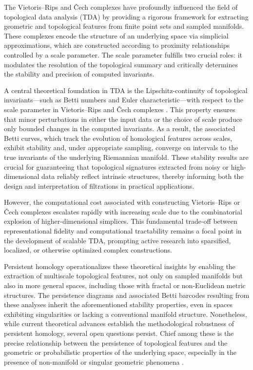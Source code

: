 \documentclass[sigconf]{acmart}
\begin{document}
The Vietoris–Rips and Čech complexes have profoundly influenced the field of topological data analysis (TDA) by providing a rigorous framework for extracting geometric and topological features from finite point sets and sampled manifolds. These complexes encode the structure of an underlying space via simplicial approximations, which are constructed according to proximity relationships controlled by a scale parameter. The scale parameter fulfills two crucial roles: it modulates the resolution of the topological summary and critically determines the stability and precision of computed invariants.

A central theoretical foundation in TDA is the Lipschitz-continuity of topological invariants—such as Betti numbers and Euler characteristic—with respect to the scale parameter in Vietoris–Rips and Čech complexes \cite{ref88}. This property ensures that minor perturbations in either the input data or the choice of scale produce only bounded changes in the computed invariants. As a result, the associated Betti curves, which track the evolution of homological features across scales, exhibit stability and, under appropriate sampling, converge on intervals to the true invariants of the underlying Riemannian manifold. These stability results are crucial for guaranteeing that topological signatures extracted from noisy or high-dimensional data reliably reflect intrinsic structures, thereby informing both the design and interpretation of filtrations in practical applications.

However, the computational cost associated with constructing Vietoris–Rips or Čech complexes escalates rapidly with increasing scale due to the combinatorial explosion of higher-dimensional simplices. This fundamental trade-off between representational fidelity and computational tractability remains a focal point in the development of scalable TDA, prompting active research into sparsified, localized, or otherwise optimized complex constructions.

Persistent homology operationalizes these theoretical insights by enabling the extraction of multiscale topological features, not only on sampled manifolds but also in more general spaces, including those with fractal or non-Euclidean metric structures. The persistence diagrams and associated Betti barcodes resulting from these analyses inherit the aforementioned stability properties, even in spaces exhibiting singularities or lacking a conventional manifold structure. Nonetheless, while current theoretical advances establish the methodological robustness of persistent homology, several open questions persist. Chief among these is the precise relationship between the persistence of topological features and the geometric or probabilistic properties of the underlying space, especially in the presence of non-manifold or singular geometric phenomena \cite{ref88}.
\end{document}
